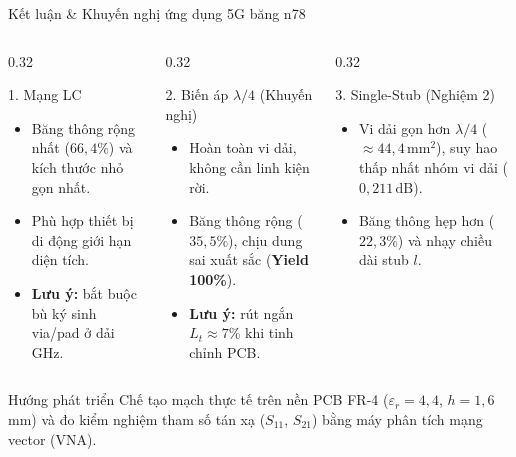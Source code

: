 \documentclass[aspectratio=169,10pt]{beamer}
\newcommand\dB{\,\mathrm{dB}}
\begin{document}
\begin{frame}{Kết luận \& Khuyến nghị ứng dụng 5G băng n78}
  \begin{columns}[T,onlytextwidth]
    \begin{column}{0.32\textwidth}
      \begin{block}{1. Mạng LC}
        \footnotesize
        \begin{itemize}
          \item Băng thông rộng nhất ($66{,}4\%$) và kích thước nhỏ gọn nhất.
          \item Phù hợp thiết bị di động giới hạn diện tích.
          \item \textbf{Lưu ý:} bắt buộc bù ký sinh via/pad ở dải GHz.
        \end{itemize}
      \end{block}
    \end{column}
    \begin{column}{0.32\textwidth}
      \begin{exampleblock}{2. Biến áp $\lambda/4$ (Khuyến nghị)}
        \footnotesize
        \begin{itemize}
          \item Hoàn toàn vi dải, không cần linh kiện rời.
          \item Băng thông rộng ($35{,}5\%$), chịu dung sai xuất sắc (\textbf{Yield 100\%}).
          \item \textbf{Lưu ý:} rút ngắn $L_t \approx 7\%$ khi tinh chỉnh PCB.
        \end{itemize}
      \end{exampleblock}
    \end{column}
    \begin{column}{0.32\textwidth}
      \begin{block}{3. Single-Stub (Nghiệm 2)}
        \footnotesize
        \begin{itemize}
          \item Vi dải gọn hơn $\lambda/4$ ($\approx44{,}4\,\mathrm{mm}^2$), suy hao thấp nhất nhóm vi dải ($0{,}211\dB$).
          \item Băng thông hẹp hơn ($22{,}3\%$) và nhạy chiều dài stub $l$.
        \end{itemize}
      \end{block}
    \end{column}
  \end{columns}
  \vspace{6pt}
  \begin{alertblock}{Hướng phát triển}
    \small
    Chế tạo mạch thực tế trên nền PCB FR-4 ($\varepsilon_r=4{,}4$, $h=1{,}6\,$mm) và đo kiểm nghiệm tham số tán xạ ($S_{11}$, $S_{21}$) bằng máy phân tích mạng vector (VNA).
  \end{alertblock}
\end{frame}
\end{document}
